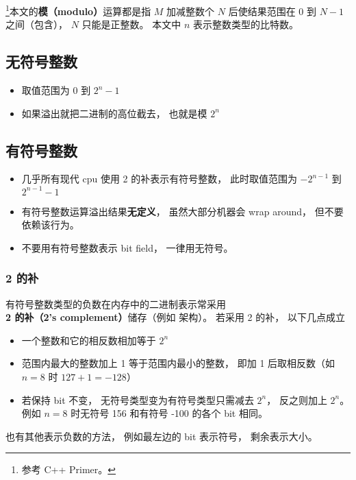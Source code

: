 

\footnote{参考 C++ Primer\cite{CppPr}。}本文的\textbf{模（modulo）}运算都是指 $M$ 加减整数个 $N$ 后使结果范围在 $0$ 到 $N-1$ 之间（包含）， $N$ 只能是正整数。 本文中 $n$ 表示整数类型的比特数。

\subsection{无符号整数}
\begin{itemize}
\item 取值范围为 $0$ 到 $2^n-1$
\item 如果溢出就把二进制的高位截去， 也就是模 $2^n$
\end{itemize}

\subsection{有符号整数}
\begin{itemize}
\item 几乎所有现代 cpu 使用 2 的补表示有符号整数， 此时取值范围为 $-2^{n-1}$ 到 $2^{n-1}-1$
\item 有符号整数运算溢出结果\textbf{无定义}， 虽然大部分机器会 wrap around， 但不要依赖该行为。
\item 不要用有符号整数表示 bit field， 一律用无符号。
\end{itemize}

\subsubsection{2 的补}
有符号整数类型的负数在内存中的二进制表示常采用 \textbf{2 的补（2's complement）}储存（例如  架构）。 若采用 2 的补， 以下几点成立
\begin{itemize}
\item 一个整数和它的相反数相加等于 $2^n$
\item 范围内最大的整数加上 1 等于范围内最小的整数， 即加 1 后取相反数（如 $n = 8$ 时 $127 + 1 = -128$）
\item 若保持 bit 不变， 无符号类型变为有符号类型只需减去 $2^n$， 反之则加上 $2^n$。 例如 $n = 8$ 时无符号 156 和有符号 -100 的各个 bit 相同。
\end{itemize}

也有其他表示负数的方法， 例如最左边的 bit 表示符号， 剩余表示大小。

